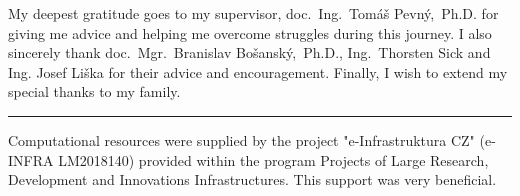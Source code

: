 \documentclass[11pt,twoside,a4paper]{book}
\begin{document}
	\translate

	{
		
		\newpage
	}

	\coverpagestarts

	\acknowledgements
	\noindent
	My deepest gratitude goes to my supervisor, doc.~Ing.~Tomáš Pevný,~Ph.D. for giving me advice and helping me overcome struggles during this journey. I also sincerely thank doc.~Mgr.~Branislav Bošanský,~Ph.D., Ing.~Thorsten Sick and Ing. Josef Liška for their advice and encouragement. Finally, I wish to extend my special thanks to my family.

	\noindent\rule{\textwidth}{0.4pt}

	\noindent Computational resources were supplied by the project "e-Infrastruktura CZ" (e-INFRA LM2018140) provided within the program Projects of Large Research, Development and Innovations Infrastructures. This support was very beneficial.


\end{document}

